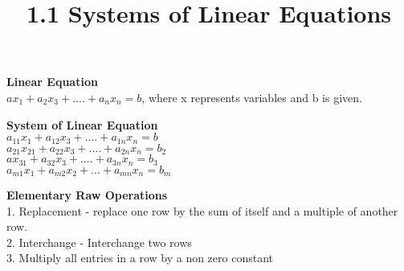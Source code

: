 \documentclass{article}
\title{1.1 Systems of Linear Equations}
\begin{document}
  \maketitle
  \textbf{Linear Equation}\\
  $ax_1+a_2x_3+....+a_nx_n=b$, where x represents variables and b is given.

  \textbf{System of Linear Equation}\\
  $a_{11}x_1+a_{12}x_3+....+a_{1n}x_n=b$\\
  $a_{21}x_{21}+a_{22}x_3+....+a_{2n}x_n=b_2$\\
  $ax_{31}+a_{32}x_3+....+a_{3n}x_n=b_3$\\
  $a_{m1}x_1+a_{m2}x_2+...+a_{mn}x_{n}=b_m$

  \textbf{Elementary Raw Operations}\\
  1. Replacement - replace one row by the sum of itself and a multiple of another row.\\
  2. Interchange - Interchange two rows\\
  3. Multiply all entries in a row by a non zero constant
\end{document}
